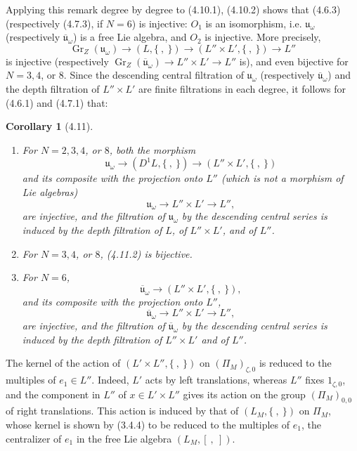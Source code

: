 \documentclass[10pt,a4paper]{article}
\newcommand{\Gr}{\operatorname{Gr}}
\newcommand{\uomega}{\mathfrak u_\omega}
\theoremstyle{deligne}
\newtheorem*{corollary*}{Corollary}
\begin{document}
Applying this remark degree by degree to (4.10.1), (4.10.2) shows that (4.6.3) (respectively (4.7.3), if \(N=6\)) is injective: \(O_1\) is an isomorphism, i.e. \(\uomega\) (respectively \(\overline{\mathfrak u}_\omega\)) is a free Lie algebra, and \(O_2\) is injective. More precisely,
\[
\tag{4.10.4}
\Gr_Z(\uomega)\longrightarrow(L,\{\ ,\ \})\longrightarrow(L''\times L',\{\ ,\ \})\longrightarrow L''
\]
is injective (respectively \(\Gr_Z(\overline{\mathfrak u}_\omega)\to L''\times L'\to L''\) is), and even bijective for \(N=3,4\), or \(8\). Since the descending central filtration of \(\uomega\) (respectively \(\overline{\mathfrak u}_\omega\)) and the depth filtration of \(L''\times L'\) are finite filtrations in each degree, it follows for (4.6.1) and (4.7.1) that:

\begin{corollary*}[4.11]
\begin{enumerate}[label=(\roman*)]
\item For \(N=2,3,4\), or \(8\), both the morphism
\[
\tag{4.11.1}
\uomega\longrightarrow(D^1L,\{\ ,\ \})\longrightarrow(L''\times L',\{\ ,\ \})
\]
and its composite with the projection onto \(L''\) (which is not a morphism of Lie algebras)
\[
\tag{4.11.2}
\uomega\longrightarrow L''\times L'\longrightarrow L'',
\]
are injective, and the filtration of \(\uomega\) by the descending central series is induced by the depth filtration of \(L\), of \(L''\times L'\), and of \(L''\).
\item For \(N=3,4\), or \(8\), (4.11.2) is bijective.
\item For \(N=6\),
\[
\tag{4.11.3}
\overline{\mathfrak u}_\omega\longrightarrow(L''\times L',\{\ ,\ \}),
\]
and its composite with the projection onto \(L''\),
\[
\tag{4.11.4}
\overline{\mathfrak u}_\omega\longrightarrow L''\times L'\longrightarrow L'',
\]
are injective, and the filtration of \(\overline{\mathfrak u}_\omega\) by the descending central series is induced by the depth filtration of \(L''\times L'\) and of \(L''\).
\end{enumerate}
\end{corollary*}

The kernel of the action of \((L'\times L'',\{\ ,\ \})\) on \((\Pi_M)_{\zeta,0}\) is reduced to the multiples of \(e_1\in L''\). Indeed, \(L'\) acts by left translations, whereas \(L''\) fixes \(1_{\zeta,0}\), and the component in \(L''\) of \(x\in L'\times L''\) gives its action on the group \((\Pi_M)_{0,0}\) of right translations. This action is induced by that of \((L_M,\{\ ,\ \})\) on \(\Pi_M\), whose kernel is shown by (3.4.4) to be reduced to the multiples of \(e_1\), the centralizer of \(e_1\) in the free Lie algebra \((L_M,[\ ,\ ])\).
\end{document}
